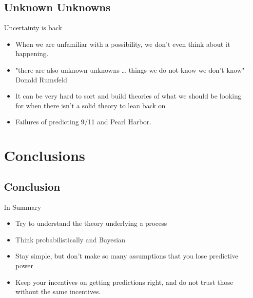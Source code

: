 \documentclass[bigger]{beamer}
\begin{document}
\subsection{Unknown Unknowns}
\label{sec-5-2}

\begin{frame}[label=sec-5-2-1]{Uncertainty is back}
\begin{itemize}
\item When we are unfamiliar with a possibility, we don't even think about
it happening.
\item "there are also unknown unknowns \ldots{} things we do not know we don't
know" - Donald Rumsfeld
\item It can be very hard to sort and build theories of what we should be
looking for when there isn't a solid theory to lean back on
\item Failures of predicting 9/11 and Pearl Harbor.
\end{itemize}
\end{frame}

\section{Conclusions}
\label{sec-6}

\subsection{Conclusion}
\label{sec-6-1}

\begin{frame}[label=sec-6-1-1]{In Summary}
\begin{itemize}
\item Try to understand the theory underlying a process
\item Think probabilistically and Bayesian
\item Stay simple, but don't make so many assumptions that you lose
predictive power
\item Keep your incentives on getting predictions right, and do not trust
those without the same incentives.
\end{itemize}
\end{frame}
\end{document}
